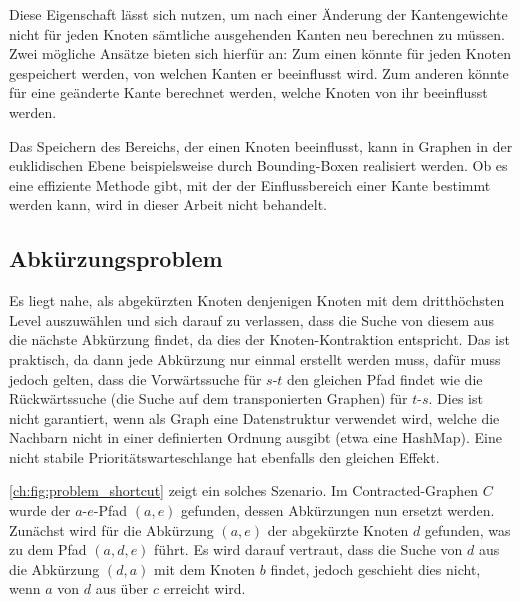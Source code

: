 Diese Eigenschaft lässt sich nutzen, um nach einer Änderung der Kantengewichte nicht für jeden Knoten sämtliche ausgehenden Kanten neu berechnen zu müssen.
Zwei mögliche Ansätze bieten sich hierfür an:
Zum einen könnte für jeden Knoten gespeichert werden, von welchen Kanten er beeinflusst wird.
Zum anderen könnte für eine geänderte Kante berechnet werden, welche Knoten von ihr beeinflusst werden.

Das Speichern des Bereichs, der einen Knoten beeinflusst, kann in Graphen in der euklidischen Ebene beispielsweise durch Bounding-Boxen realisiert werden.
Ob es eine effiziente Methode gibt, mit der der Einflussbereich einer Kante bestimmt werden kann, wird in dieser Arbeit nicht behandelt.

\subsection{Abkürzungsproblem}

Es liegt nahe, als abgekürzten Knoten denjenigen Knoten mit dem dritthöchsten Level auszuwählen und sich darauf zu verlassen, dass die Suche von diesem aus die nächste Abkürzung findet, da dies der Knoten-Kontraktion entspricht.
Das ist praktisch, da dann jede Abkürzung nur einmal erstellt werden muss, dafür muss jedoch gelten, dass die Vorwärtssuche für $s$-$t$ den gleichen Pfad findet wie die Rückwärtssuche (die Suche auf dem transponierten Graphen) für $t$-$s$.
Dies ist nicht garantiert, wenn als Graph eine Datenstruktur verwendet wird, welche die Nachbarn nicht in einer definierten Ordnung ausgibt (etwa eine HashMap).
Eine nicht stabile Prioritätswarteschlange hat ebenfalls den gleichen Effekt.

\autoref{ch:fig:problem_shortcut} zeigt ein solches Szenario.
Im Contracted-Graphen $C$ wurde der $a$-$e$-Pfad $(a, e)$ gefunden, dessen Abkürzungen nun ersetzt werden.
Zunächst wird für die Abkürzung $(a, e)$ der abgekürzte Knoten $d$ gefunden, was zu dem Pfad $(a, d, e)$ führt.
Es wird darauf vertraut, dass die Suche von $d$ aus die Abkürzung $(d, a)$ mit dem Knoten $b$ findet, jedoch geschieht dies nicht, wenn $a$ von $d$ aus über $c$ erreicht wird.

